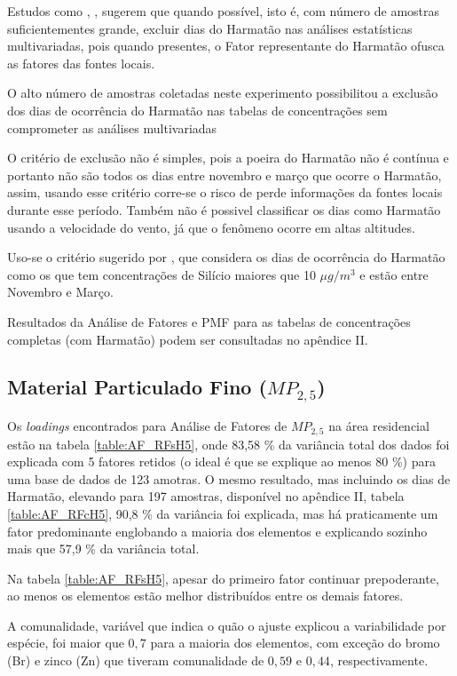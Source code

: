 Estudos como \citet{aboh2009}, \citet{ofosu2013}, \citet{ofosu2012} sugerem que
quando possível, isto é, com número de amostras suficientementes grande, excluir
dias do Harmatão nas análises estatísticas multivariadas, pois quando 
presentes, o Fator representante do Harmatão ofusca as fatores das fontes
locais.

O alto número de amostras coletadas neste experimento 
possibilitou a exclusão dos dias de 
ocorrência do Harmatão nas tabelas de concentrações sem comprometer as análises
multivariadas

O critério de exclusão não é simples, pois a poeira do Harmatão não é contínua 
e portanto não são todos os dias entre novembro e março que ocorre o Harmatão, 
assim, usando esse critério corre-se o risco de perde informações da fontes
locais durante esse período. 
Também não é possivel classificar os dias como Harmatão usando a velocidade do 
vento, já que o fenômeno ocorre em altas altitudes. 

Uso-se o critério sugerido por \citet{aboh2009}, que considera os dias de 
ocorrência do Harmatão como os que tem concentrações de Silício maiores que 
10 $\mu g/m^3$ e estão entre Novembro e Março.

Resultados da Análise de Fatores e PMF para as tabelas de concentrações 
completas (com Harmatão) podem ser consultadas no apêndice II. 

\subsection{Material Particulado Fino ($MP_{2,5}$)}

Os \textit{loadings} encontrados para Análise de Fatores de $MP_{2,5}$
na área residencial estão na tabela \ref{table:AF_RFsH5}, onde 83,58 \% 
da variância total dos dados foi explicada com 5 fatores retidos 
(o ideal é que se explique ao menos 80 \%) para uma base de dados de 123 amotras. 
O mesmo resultado, mas incluindo os dias de Harmatão, elevando para 197 amostras, 
disponível no apêndice II, tabela \ref{table:AF_RFcH5}, 90,8 \% da variância
foi explicada, mas há praticamente um fator predominante 
englobando a maioria dos elementos e explicando sozinho mais que 57,9 \% da 
variância total.

Na tabela \ref{table:AF_RFsH5}, apesar do primeiro fator continuar prepoderante,
ao menos os elementos estão melhor distribuídos entre os demais fatores.  

A comunalidade, variável que indica o quão o ajuste explicou a variabilidade por 
espécie, foi maior que $0,7$ para a maioria dos elementos,
com exceção do bromo (Br) e zinco (Zn) que tiveram comunalidade de $0,59$ e 
$0,44$, respectivamente.

